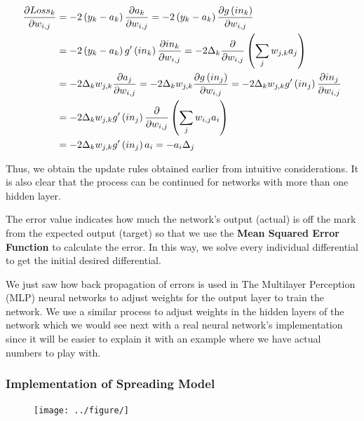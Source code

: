\documentclass{mcmthesis}
\begin{document}
\begin{align}
\label{omg}
\frac{\partial Loss_{k}}{\partial w_{i,j}} &=-2\left ( y_{k}-a_{k} \right )\frac{\partial a_{k}}{\partial w_{i,j}}=-2\left ( y_{k}-a_{k} \right )\frac{\partial g\left ( in_{k} \right )}{\partial w_{i,j}} \notag\\
&=-2\left ( y_{k}-a_{k} \right )g{}'\left ( in_{k} \right ) \frac{\partial in_{k}}{\partial w_{i,j}} = -2\Delta_{k}\frac{\partial }{\partial w_{i,j}} \left ( \sum_{j} w_{j,k}a_{j}\right )\notag\\ &=-2\Delta_{k}w_{j,k}\frac{\partial a_{j}}{\partial w_{i,j}}=-2\Delta_{k}w_{j,k}\frac{\partial g\left ( in_{j} \right )}{\partial w_{i,j}}=-2\Delta_{k}w_{j,k}g{}'\left ( in_{j} \right )\frac{\partial in_{j}}{\partial w_{i,j}}\notag\\ &=-2\Delta_{k}w_{j,k}g{}'\left ( in_{j} \right )\frac{\partial }{\partial w_{i,j}}\left ( \sum_{j} w_{i,j}a_{i}\right )\notag\\ 
&=-2\Delta_{k}w_{j,k}g{}'\left ( in_{j} \right )a_{i} = -a_{i}\Delta_{j}
\end{align}

 Thus, we obtain the update rules obtained earlier from intuitive considerations. It is also clear that the process can be continued for networks with more than one hidden layer.

The error value indicates how much the network's output (actual) is off the mark from the expected output (target) so that we use the \textbf{Mean Squared Error Function} to calculate the error. In this way, we solve every individual differential to get the initial desired differential.

We just saw how back propagation of errors is used in The Multilayer Perception (MLP) neural networks to adjust weights for the output layer to train the network. We use a similar process to adjust weights in the hidden layers of the network which we would see next with a real neural network's implementation since it will be easier to explain it with an example where we have actual numbers to play with.

\subsubsection{Implementation of Spreading Model}

\begin{figure}[htbp]
	\centering 
	\texttt{[image: ../figure/]}  
	\caption{} 
	\label{}  
\end{figure}
\end{document}
